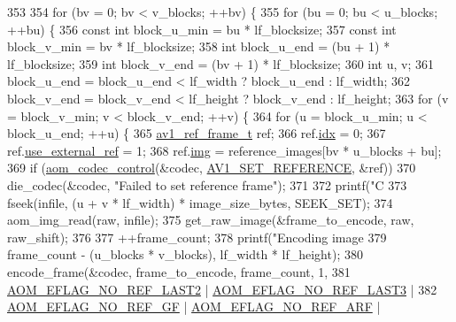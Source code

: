 \begin{DoxyCodeInclude}
{{{{{{{353 
354   \textcolor{keywordflow}{for} (bv = 0; bv < v\_blocks; ++bv) \{
355     \textcolor{keywordflow}{for} (bu = 0; bu < u\_blocks; ++bu) \{
356       \textcolor{keyword}{const} \textcolor{keywordtype}{int} block\_u\_min = bu * lf\_blocksize;
357       \textcolor{keyword}{const} \textcolor{keywordtype}{int} block\_v\_min = bv * lf\_blocksize;
358       \textcolor{keywordtype}{int} block\_u\_end = (bu + 1) * lf\_blocksize;
359       \textcolor{keywordtype}{int} block\_v\_end = (bv + 1) * lf\_blocksize;
360       \textcolor{keywordtype}{int} u, v;
361       block\_u\_end = block\_u\_end < lf\_width ? block\_u\_end : lf\_width;
362       block\_v\_end = block\_v\_end < lf\_height ? block\_v\_end : lf\_height;
363       \textcolor{keywordflow}{for} (v = block\_v\_min; v < block\_v\_end; ++v) \{
364         \textcolor{keywordflow}{for} (u = block\_u\_min; u < block\_u\_end; ++u) \{
365           \hyperlink{structav1__ref__frame}{av1\_ref\_frame\_t} ref;
366           ref.\hyperlink{structav1__ref__frame_a7c6fcaba58f514985448cb2e2245345c}{idx} = 0;
367           ref.\hyperlink{structav1__ref__frame_a33749c5c20033cc5f7582d0ec1c34ff0}{use\_external\_ref} = 1;
368           ref.\hyperlink{structav1__ref__frame_a55a09db9e1acdd73e656b01fa01283b3}{img} = reference\_images[bv * u\_blocks + bu];
369           \textcolor{keywordflow}{if} (\hyperlink{group__codec_ga6da974f4eeaba1fa74106b28d0fe6ac5}{aom\_codec\_control}(&codec, \hyperlink{group__aom_gga9421a1fa78c0d9587ae5aa6c1cb3d659a51ad4467b4dc318406cceb257e2daa41}{AV1\_SET\_REFERENCE}, &ref))
370             die\_codec(&codec, \textcolor{stringliteral}{"Failed to set reference frame"});
371 
372           printf(\textcolor{stringliteral}{"C%
373           fseek(infile, (u + v * lf\_width) * image\_size\_bytes, SEEK\_SET);
374           aom\_img\_read(raw, infile);
375           get\_raw\_image(&frame\_to\_encode, raw, raw\_shift);
376 
377           ++frame\_count;
378           printf(\textcolor{stringliteral}{"Encoding image %
379                  frame\_count - (u\_blocks * v\_blocks), lf\_width * lf\_height);
380           encode\_frame(&codec, frame\_to\_encode, frame\_count, 1,
381                        \hyperlink{group__aom__encoder_ga50c2560ca6670298cfc614ecae96a391}{AOM\_EFLAG\_NO\_REF\_LAST2} | 
      \hyperlink{group__aom__encoder_gaa4bc8ae2b977b73f0ef57ba428ca1d2c}{AOM\_EFLAG\_NO\_REF\_LAST3} |
382                            \hyperlink{group__aom__encoder_gaaef6fe76991abf87edd2f296eee999f8}{AOM\_EFLAG\_NO\_REF\_GF} | 
      \hyperlink{group__aom__encoder_ga9e2f989737d63ddf4e987a525d186a46}{AOM\_EFLAG\_NO\_REF\_ARF} |
}}}}}}}}}
\end{DoxyCodeInclude}
